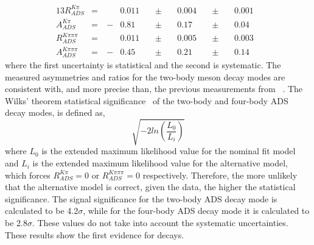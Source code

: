 \begin{alignat*}{13}
R_{ADS}^{K\pi} &= &\ &0.011&\ &\pm&\ &0.004&\ &\pm&\ &0.001& \\
A_{ADS}^{K\pi} &= &\ -&0.81&\ &\pm&\ &0.17&\ &\pm&\ &0.04& \\
R_{ADS}^{K\pi\pi\pi} &= &\ &0.011&\ &\pm&\ &0.005&\ &\pm&\ &0.003& \\
A_{ADS}^{K\pi\pi\pi} &= &\ -&0.45&\ &\pm&\ &0.21&\ &\pm&\ &0.14&
\end{alignat*}
where the first uncertainty is statistical and the second is systematic. The measured asymmetries and ratios for the two-body \Dz meson decay modes are consistent with, and more precise than, the previous measurements from \babar~\cite{BaBarDKstar}. The Wilks' theorem statistical significance~\cite{Wilks:1938dza} of the two-body and four-body ADS decay modes, is defined as,
\begin{equation}
\sqrt{-2ln\left(\frac{L_0}{L_i}\right)}
\end{equation}
where $L_0$ is the extended maximum likelihood value for the nominal \CP fit model and $L_i$ is the extended maximum likelihood value for the alternative model, which forces $R_{ADS}^{K\pi} = 0$ or $R_{ADS}^{K\pi\pi\pi} = 0$ respectively. Therefore, the more unlikely that the alternative model is correct, given the data, the higher the statistical significance. The signal significance for the two-body ADS decay mode is calculated to be 4.2$\sigma$, while for the four-body ADS decay mode it is calculated to be 2.8$\sigma$. These values do not take into account the systematic uncertainties. These results show the first evidence for \pik decays.

